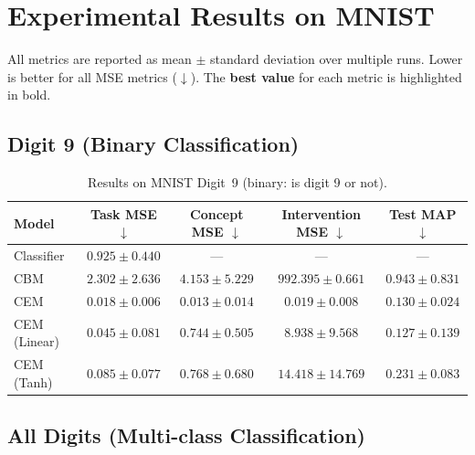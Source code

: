 \documentclass{article}
\begin{document}
\section*{Experimental Results on MNIST}

All metrics are reported as mean $\pm$ standard deviation over multiple runs.
Lower is better for all MSE metrics ($\downarrow$).
The \textbf{best value} for each metric is highlighted in bold.

\subsection*{Digit 9 (Binary Classification)}

\begin{table}[h]
\centering
\caption{Results on MNIST Digit~9 (binary: is digit 9 or not).}
\label{tab:digit9}
\begin{tabular}{lcccc}
\toprule
\textbf{Model}
  & \textbf{Task MSE} $\downarrow$
  & \textbf{Concept MSE} $\downarrow$
  & \textbf{Intervention MSE} $\downarrow$
  & \textbf{Test MAP} $\downarrow$ \\
\midrule
Classifier
  & $0.925 \pm 0.440$
  & ---
  & ---
  & --- \\
CBM
  & $2.302 \pm 2.636$
  & $4.153 \pm 5.229$
  & $992.395 \pm 0.661$
  & $0.943 \pm 0.831$ \\
CEM
  & $\mathbf{0.018 \pm 0.006}$
  & $\mathbf{0.013 \pm 0.014}$
  & $\mathbf{0.019 \pm 0.008}$
  & $0.130 \pm 0.024$ \\
CEM (Linear)
  & $0.045 \pm 0.081$
  & $0.744 \pm 0.505$
  & $8.938 \pm 9.568$
  & $\mathbf{0.127 \pm 0.139}$ \\
CEM (Tanh)
  & $0.085 \pm 0.077$
  & $0.768 \pm 0.680$
  & $14.418 \pm 14.769$
  & $0.231 \pm 0.083$ \\
\bottomrule
\end{tabular}
\end{table}

\subsection*{All Digits (Multi-class Classification)}
\end{document}
